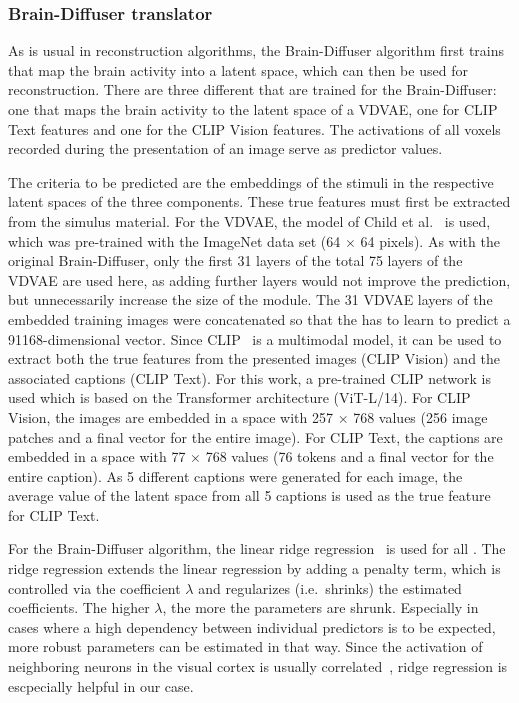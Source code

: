 \subsubsection{Brain-Diffuser translator}
As is usual in reconstruction algorithms, the Brain-Diffuser algorithm first trains  that map the brain activity into a latent space, which can then be used for reconstruction. There are three different  that are trained for the Brain-Diffuser: one that maps the brain activity to the latent space of a VDVAE, one for CLIP Text features and one for the CLIP Vision features. The activations of all voxels recorded during the presentation of an image serve as predictor values.

The criteria to be predicted are the embeddings of the stimuli in the respective latent spaces of the three components. These true features must first be extracted from the simulus material. For the VDVAE, the model of Child et al.~\cite{childVeryDeepVAEs2020} is used, which was pre-trained with the ImageNet data set (64 $\times$ 64 pixels). As with the original Brain-Diffuser, only the first 31 layers of the total 75 layers of the VDVAE are used here, as adding further layers would not improve the prediction, but unnecessarily increase the size of the  module. The 31 VDVAE layers of the embedded training images were concatenated so that the  has to learn to predict a 91168-dimensional vector. 
Since CLIP~\cite{radfordLearningTransferableVisual2021} is a multimodal model, it can be used to extract both the true features from the presented images (CLIP Vision) and the associated captions (CLIP Text). For this work, a pre-trained CLIP network is used which is based on the Transformer architecture (ViT-L/14). For CLIP Vision, the images are embedded in a space with 257 $\times$ 768 values (256 image patches and a final vector for the entire image). For CLIP Text, the captions are embedded in a space with 77 $\times$ 768 values (76 tokens and a final vector for the entire caption). As 5 different captions were generated for each image, the average value of the latent space from all 5 captions is used as the true feature for CLIP Text.


For the Brain-Diffuser algorithm, the linear ridge regression~\cite{hoerlRidgeRegressionBiased1970} is used for all . The ridge regression extends the linear regression by adding a penalty term, which is controlled via the coefficient $\lambda$ and regularizes (i.e.\ shrinks) the estimated coefficients. The higher $\lambda$, the more the parameters are shrunk. Especially in cases where a high dependency between individual predictors is to be expected, more robust parameters can be estimated in that way. Since the activation of neighboring neurons in the visual cortex is usually correlated~\cite{smithSpatialTemporalScales2008}, ridge regression is escpecially helpful in our case.

